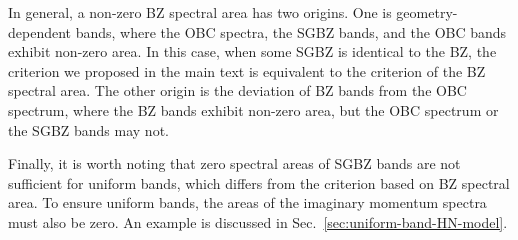 In general, a non-zero BZ spectral area has two origins. One is geometry-dependent
bands, where the OBC spectra, the SGBZ bands, and the OBC bands exhibit
non-zero area. In this case, when some SGBZ is identical to the BZ,
the criterion we proposed in the main text is equivalent to the criterion
of the BZ spectral area. The other origin is the deviation of BZ bands
from the OBC spectrum, where the BZ bands exhibit non-zero area, but
the OBC spectrum or the SGBZ bands may not.

Finally, it is worth noting that zero spectral areas of SGBZ bands
are not sufficient for uniform bands, which differs from the criterion
based on BZ spectral area. To ensure uniform bands, the areas of the imaginary momentum spectra
must also be zero. An example is discussed in Sec.~\ref{sec:uniform-band-HN-model}.



% 

